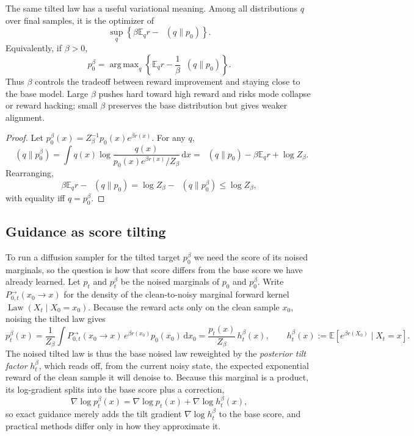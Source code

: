 \documentclass[10pt,a4paper]{amsart}
\numberwithin{equation}{section}
\DeclareMathOperator{\KL}{D_{\mathsf{KL}}}
\DeclareMathOperator{\Law}{Law}
\DeclareMathOperator{\argmax}{arg\,max}
\newcommand{\E}{\mathbb{E}}
\newcommand{\dd}{\,\mathrm{d}}
\begin{document}
The same tilted law has a useful variational meaning.  Among all distributions
$q$ over final samples, it is the optimizer of
\begin{equation}\label{eq:gibbs-variational}
    \sup_q
    \left\{
    \beta\E_q r-\KL(q\|p_0)
    \right\}.
\end{equation}
Equivalently, if $\beta>0$,
\[
    p_0^\beta
    =
    \argmax_q
    \left\{
    \E_q r-\frac1\beta\KL(q\|p_0)
    \right\}.
\]
Thus $\beta$ controls the tradeoff between
reward improvement and staying close to the base model.  Large $\beta$ pushes
hard toward high reward and risks mode collapse or reward hacking; small
$\beta$ preserves the base distribution but gives weaker alignment.

\begin{proof}
Let $p_0^\beta(x)=Z_\beta^{-1}p_0(x)e^{\beta r(x)}$.  For any $q$,
\[
    \KL(q\|p_0^\beta)
    =
    \int q(x)\log\frac{q(x)}{p_0(x)e^{\beta r(x)}/Z_\beta}\dd x
    =
    \KL(q\|p_0)-\beta\E_q r+\log Z_\beta.
\]
Rearranging,
\[
    \beta\E_q r-\KL(q\|p_0)
    =
    \log Z_\beta-\KL(q\|p_0^\beta)
    \leq \log Z_\beta,
\]
with equality iff $q=p_0^\beta$.
\end{proof}

\subsection{Guidance as score tilting}
\label{subsec:guidance-score}

To run a diffusion sampler for the tilted target $p_0^\beta$ we need the score of
its noised marginals, so the question is how that score differs from the base
score we have already learned.  Let $p_t$ and $p_t^\beta$ be the noised marginals
of $p_0$ and $p_0^\beta$.  Write $P_{0,t}^{\to}(x_0\to x)$ for the density of
the clean-to-noisy marginal forward kernel $\Law(X_t\mid X_0=x_0)$.  Because the reward acts only on the clean
sample $x_0$, noising the tilted law gives
\[
    p_t^\beta(x)
    =
    \frac{1}{Z_\beta}\int P_{0,t}^{\to}(x_0\to x)\,
    e^{\beta r(x_0)}p_0(x_0)\dd x_0
    =
    \frac{p_t(x)}{Z_\beta}\,h_t^\beta(x),
    \qquad
    h_t^\beta(x):=\E\!\left[e^{\beta r(X_0)}\mid X_t=x\right].
\]
The noised tilted law is thus the base noised law reweighted by the
\emph{posterior tilt factor} $h_t^\beta$, which reads off, from the current noisy
state, the expected exponential reward of the clean sample it will denoise to.
Because this marginal is a product, its log-gradient splits into the base score
plus a correction,
\[
    \nabla\log p_t^\beta(x)
    =
    \nabla\log p_t(x)+\nabla\log h_t^\beta(x),
\]
so exact guidance merely adds the tilt gradient $\nabla\log h_t^\beta$ to the
base score, and practical methods differ only in how they approximate it.
\end{document}
